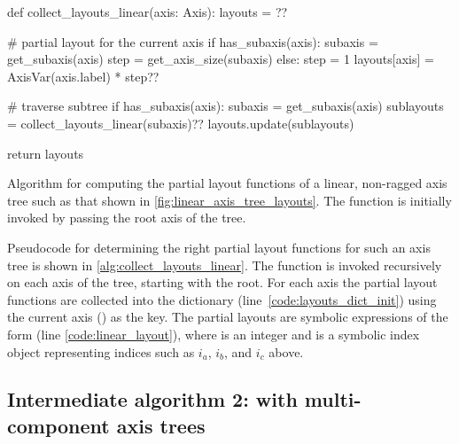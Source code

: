 \documentclass[thesis]{subfiles}
\begin{document}
\begin{algorithm}
  \begin{center}
    \begin{minipage}{.9\textwidth}
      \begin{pyalg2}
        def collect_layouts_linear(axis: Axis):
          layouts = {}?\label{code:layouts_dict_init}?

          # partial layout for the current axis
          if has_subaxis(axis):
            subaxis = get_subaxis(axis)
            step = get_axis_size(subaxis)
          else:
            step = 1
          layouts[axis] = AxisVar(axis.label) * step?\label{code:linear_layout}?

          # traverse subtree
          if has_subaxis(axis): 
            subaxis = get_subaxis(axis)
            sublayouts = collect_layouts_linear(subaxis)?\label{code:linear_sublayouts}?
            layouts.update(sublayouts)

          return layouts
      \end{pyalg2}
    \end{minipage}
  \end{center}

  \caption{
    Algorithm for computing the partial layout functions of a linear, non-ragged axis tree such as that shown in \cref{fig:linear_axis_tree_layouts}.
    The function is initially invoked by passing the root axis of the tree.
  }
  \label{alg:collect_layouts_linear}
\end{algorithm}

Pseudocode for determining the right partial layout functions for such an axis tree is shown in \cref{alg:collect_layouts_linear}.
The function  is invoked recursively on each axis of the tree, starting with the root.
For each axis the partial layout functions are collected into the  dictionary (line~\ref{code:layouts_dict_init}) using the current axis () as the key.
The partial layouts are symbolic expressions of the form  (line \ref{code:linear_layout}), where  is an integer and  is a symbolic index object representing indices such as $i_a$, $i_b$, and $i_c$ above.

\subsection{Intermediate algorithm 2: with multi-component axis trees}
\label{sec:layout_alg_multi_component}
\end{document}
